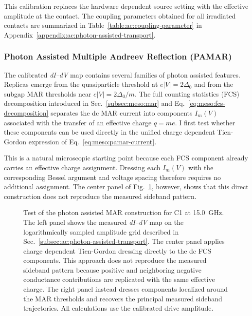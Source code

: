         This calibration replaces the hardware dependent source setting with the effective amplitude at the contact. The coupling parameters obtained for all irradiated contacts are summarized in Table~\ref{table:ac:coupling-parameter} in Appendix~\ref{appendix:ac:photon-assisted-transport}.

    \subsubsection*{Photon Assisted Multiple Andreev Reflection (PAMAR)}

        The calibrated \textit{dI--dV} map contains several families of photon assisted features. Replicas emerge from the quasiparticle threshold at $e|V|=2\Delta_0$ and from the subgap MAR thresholds near $e|V|=2\Delta_0/m$. The full counting statistics (FCS) decomposition introduced in Sec.~\ref{subsec:meso:mar} and Eq.~\eqref{eq:meso:fcs-decomposition} separates the dc MAR current into components $I_m(V)$ associated with the transfer of an effective charge $q=me$. I first test whether these components can be used directly in the unified charge dependent Tien-Gordon expression of Eq.~\eqref{eq:meso:pamar-current}.

        This is a natural microscopic starting point because each FCS component already carries an effective charge assignment. Dressing each $I_m(V)$ with the corresponding Bessel argument and voltage spacing therefore requires no additional assignment. The center panel of Fig.~\ref{fig:ac:contact1:exp-pamar}, however, shows that this direct construction does not reproduce the measured sideband pattern.

        \begin{figure}[t]
            \centering
            \caption{
                Test of the photon assisted MAR construction for C1 at \qty{15.0}{\giga\hertz}. The left panel shows the measured \textit{dI--dV} map on the logarithmically sampled amplitude grid described in Sec.~\ref{subsec:ac:photon-assisted-transport}. The center panel applies charge dependent Tien-Gordon dressing directly to the dc FCS components. This approach does not reproduce the measured sideband pattern because positive and neighboring negative conductance contributions are replicated with the same effective charge. The right panel instead dresses components localized around the MAR thresholds and recovers the principal measured sideband trajectories. All calculations use the calibrated drive amplitude.
            }
            \label{fig:ac:contact1:exp-pamar}
        \end{figure}

